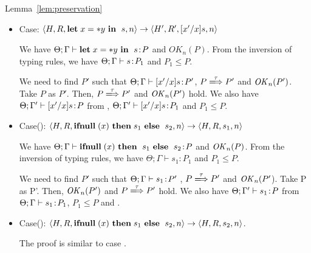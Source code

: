 \begin{pfof}{Lemma~\ref{lem:preservation}}
\begin{itemize}
  We have \(\Theta; \Gamma \vdash \LET x = \NULL \ \IN \ s\COL P\)
  and \(OK_{n}(P)\). From the inversion of typing rules, we have
  \(\Theta; \Gamma \vdash s\COL P_{1}\) and \( P_{1} \le P\).

  We need to find $P'$ such that \(\Theta; \Gamma' \vdash [x'/x]s\COL P'\),
  \(P \xLongrightarrow{\tau} P'\) and \(\OK_n(P')\).  Take \(P\) as
  \(P'\).  Then, \(P \xLongrightarrow{\tau} P'\) and \(\OK_n(P')\) hold.  We
  also have \(\Theta; \Gamma \vdash [x'/x]s\COL P\) from ,
  \(\Theta; \Gamma \vdash [x'/x]s\COL P_{1}\)\( P_{1} \le
  P\). 

\item Case: $\langle H, R, \mathbf{let}\; x = *y \ \mathbf{in}\; \ s, n \rangle
  \rightarrow \langle H', R', [x'/x]s, n \rangle $

  We have \(\Theta; \Gamma \vdash \mathbf{let}\; x = *y \ \mathbf{in}\; \ s\!:\!  P\) and
  \(OK_{n}(P)\). From the inversion of typing rules, we have \(\Theta;
  \Gamma \vdash s\COL P_{1}\) and \(P_{1} \le P\).

  We need to find \(P'\) such that \(\Theta; \Gamma \vdash [x'/x]s\!:\!
  P'\), \(P \xLongrightarrow{\tau} P'\) and \(\OK_n(P')\). Take \(P\) as
  \(P'\). Then, \(P \xLongrightarrow{\tau} P'\) and \(\OK_n(P')\) hold.  We
  also have \(\Theta; \Gamma' \vdash [x'/x]s\!:\! P\) from ,
  \(\Theta; \Gamma' \vdash [x'/x]s\!:\! P_{1}\) and \(P_{1} \le P\).
        
\item Case(): \(\langle H, R, \IFNULL \Cirx \ \THEN s_{1} \ \ELSE \ s_{2},
  n \rangle \rightarrow \langle H, R, s_{1}, n \rangle\)

  We have \(\Theta; \Gamma \vdash \mathbf{ifnull}\; (x) \ \mathbf{then}\; \ s_{1}
  \ \mathbf{else}\; \ s_{2}\!:\! P\) and \(\mathit{OK}_{n}(P)\). From the inversion of
  typing rules, we have \(\Theta; \Gamma \vdash s_{1} : P_{1}\) and \(P_{1}
  \le P\).

  We need to find $P'$ such that \(\Theta; \Gamma \vdash s_1\!:\! P'\)
  , \(P \xLongrightarrow{\tau} P'\) and \(\mathit{OK}_n(P'\)).  Take P as P'.  Then,
  \(\OK_n(P')\) and \(P \xLongrightarrow{\tau} P'\) hold. We also have \(\Theta;
  \Gamma' \vdash s_{1}\!:\! P\) from \(\Theta; \Gamma \vdash s_{1}\!:\!
  P_1\), \(P_{1} \le P\) and .

\item Case(): \(\langle H, R, \IFNULL \Cirx \ \THEN s_{1} \ \ELSE \ s_{2},
  n \rangle \rightarrow \langle H, R, s_{2}, n \rangle\).

 The proof is similar to case . 


\end{itemize}
\end{pfof}
